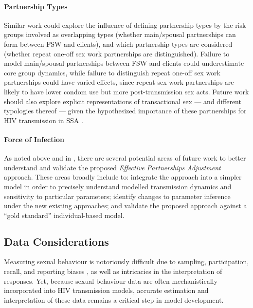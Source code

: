 \paragraph{Partnership Types}
Similar work could explore the influence of defining partnership types
by the risk groups involved \vs as overlapping types
(\eg whether main/spousal partnerships can form between FSW and clients),
and which partnership types are considered
(\eg whether repeat \vs one-off sex work partnerships are distinguished).
Failure to model main/spousal partnerships between FSW and clients
could underestimate core group dynamics, while
failure to distinguish repeat \vs one-off sex work partnerships could have varied effects,
since repeat sex work partnerships are likely to have
lower condom use but more post-transmission sex acts.
Future work should also explore explicit representations of transactional sex
--- and different typologies thereof \cite{Fielding-Miller2016} ---
given the hypothesized importance of these partnerships
for HIV transmission in SSA \cite{Wamoyi2016}.
\paragraph{Force of Infection}
As noted above and in ,
there are several potential areas of future work to better understand and validate
the proposed \emph{Effective Partnerships Adjustment} approach.
These areas broadly include to:
integrate the approach into a simpler model in order to precisely understand
modelled transmission dynamics and sensitivity to particular parameters;
identify changes to parameter inference under the new \vs existing approaches; and
validate the proposed approach against a ``gold standard'' individual-based model.
\subsection{Data Considerations}\label{conc.future.data}
Measuring sexual behaviour is notoriously difficult due to
sampling, participation, recall, and reporting biases \cite{Fenton2001},
as well as intricacies in the interpretation of responses.
Yet, because sexual behaviour data are often
mechanistically incorporated into HIV transmission models,
accurate estimation and interpretation of these data remains a critical step in model development.
